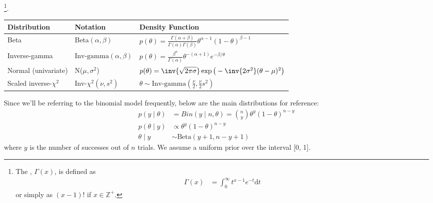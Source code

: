 \documentclass[11pt]{article}
\newcommand\myspace[1][]{\vspace{#1\bigskipamount}}
\newcommand\p{\Needspace{10\baselineskip} \noindent}
\begin{document}
\myspace
\p {}\footnote{The , $\Gamma(x)$, is defined as 
	\begin{align}
		\Gamma(x) &= \int_0^\infty t^{x - 1} e^{-t} \mathrm{d}t
	\end{align}
or simply as $(x - 1)!$ if $x \in \mathbb{Z}^+$. }. 
\begin{table*}[h!]
	\centering
	\begin{tabular}{l l l}
		\toprule
		Distribution & Notation & Density Function \\ \midrule
		Beta & Beta$(\alpha, \beta)$ & $p(\theta) = \tfrac{\Gamma(\alpha + \beta)}{ \Gamma(\alpha)\Gamma(\beta) } \theta^{\alpha - 1}(1 - \theta)^{\beta -1}$  \\ 
		Inverse-gamma & $\text{Inv-gamma}(\alpha, \beta)$	& $p(\theta) = \tfrac{\beta^\alpha}{\Gamma(\alpha)}\theta^{-(\alpha + 1)} e^{-\beta/\theta}  $   \\	
		Normal (univariate) & N($\mu, \sigma^2$) & $p(\theta) = \inv{\sqrt{2 \pi \sigma}} \exp\big( - \inv{2\sigma^2} (\theta - \mu)^2  \big)$ \\
		Scaled inverse-$\chi^2$ & Inv-$\chi^2(\nu, s^2)$  &  $\theta \sim \text{Inv-gamma}(\tfrac{\nu}{2}, \tfrac{\nu}{2}s^2)$ \\
		\bottomrule
	\end{tabular}
	\label{table:distributions}
\end{table*}




\p Since we'll be referring to the binomial model frequently, below are the main distributions for reference:
\begin{align}
	p(y \mid \theta) &= Bin(y \mid n, \theta) = \binom{n}{y} \theta^y (1 - \theta)^{n - y} \\
	p(\theta \mid y) &\propto \theta^y (1 - \theta)^{n - y} \\
	\theta \mid y &\sim \text{Beta}(y + 1, n - y + 1) 
\end{align}
where $y$ is the number of successes out of $n$ trials. We assume a uniform prior over the interval [0, 1]. 
\end{document}

